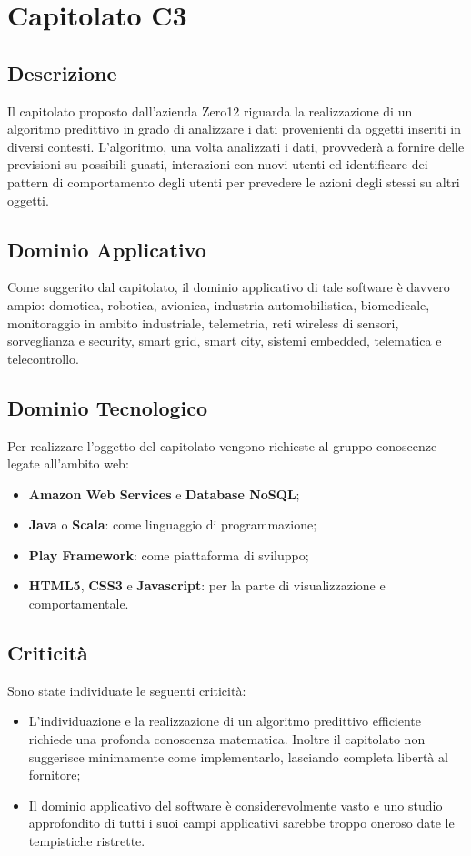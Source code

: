 \newpage
\section{Capitolato C3}
\subsection{Descrizione}
Il capitolato proposto dall'azienda Zero12 riguarda la realizzazione di un algoritmo predittivo in grado di analizzare i dati provenienti da oggetti inseriti in diversi contesti. L'algoritmo, una volta analizzati i dati, provvederà a fornire delle previsioni su possibili guasti, interazioni con nuovi utenti ed identificare dei pattern di comportamento degli utenti per prevedere le azioni degli stessi su altri oggetti.

\subsection{Dominio Applicativo}
Come suggerito dal capitolato, il dominio applicativo di tale software è davvero ampio: domotica, robotica, avionica, industria automobilistica, biomedicale, monitoraggio in ambito industriale, telemetria, reti wireless di sensori, sorveglianza e security, smart grid, smart city, sistemi embedded, telematica e telecontrollo.

\subsection{Dominio Tecnologico}
Per realizzare l'oggetto del capitolato vengono richieste al gruppo conoscenze legate all'ambito web:
\begin{itemize}
\item \textbf{Amazon Web Services} e \textbf{Database NoSQL};
\item \textbf{Java} o \textbf{Scala}: come linguaggio di programmazione;
\item \textbf{Play Framework}: come piattaforma di sviluppo;
\item \textbf{HTML5}, \textbf{CSS3} e \textbf{Javascript}: per la parte di visualizzazione e comportamentale.
\end{itemize}

\subsection{Criticità}
Sono state individuate le seguenti criticità:
\begin{itemize}
\item L'individuazione e la realizzazione di un algoritmo predittivo efficiente richiede una profonda conoscenza matematica. Inoltre il capitolato non suggerisce minimamente come implementarlo, lasciando completa libertà al fornitore;
\item Il dominio applicativo del software è considerevolmente vasto e uno studio approfondito di tutti i suoi campi applicativi sarebbe troppo oneroso date le tempistiche ristrette.
\end{itemize}


